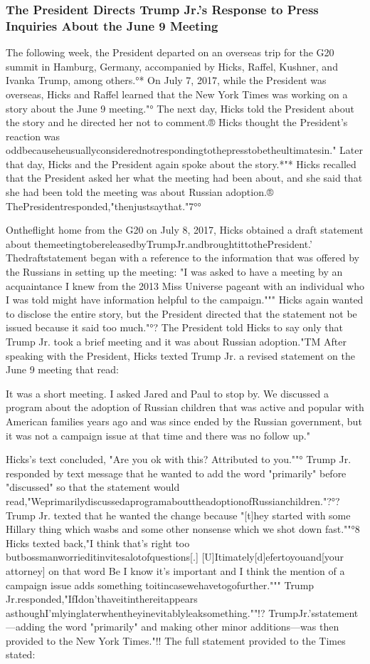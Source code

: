 \subsubsection{The President Directs Trump Jr.'s Response to Press Inquiries About the June 9 Meeting}

The following week, the President departed on an overseas trip for the G20 summit in Hamburg, Germany, accompanied by Hicks, Raffel, Kushner, and Ivanka Trump, among others.°*
On July 7, 2017, while the President was overseas, Hicks and Raffel learned that the New York Times was working on a story about the June 9 meeting."°
The next day, Hicks told the President about the story and he directed her not to comment.®
Hicks thought the President's reaction was oddbecauseheusuallyconsiderednotrespondingtothepresstobetheultimatesin."
Later that day, Hicks and the President again spoke about the story.*"*
Hicks recalled that the President asked her what the meeting had been about, and she said that she had been told the meeting was about Russian adoption.® ThePresidentresponded,"thenjustsaythat."7°°

Ontheflight home from the G20 on July 8, 2017, Hicks obtained a draft statement about themeetingtobereleasedbyTrumpJr.andbroughtittothePresident.'
Thedraftstatement began with a reference to the information that was offered by the Russians in setting up the meeting: "I was asked to have a meeting by an acquaintance I knew from the 2013 Miss Universe pageant with an individual who I was told might have information helpful to the campaign."""
Hicks again wanted to disclose the entire story, but the President directed that the statement not be
issued because it said too much."°? The President told Hicks to say only that Trump Jr. took a brief meeting and it was about Russian adoption."TM
After speaking with the President, Hicks texted Trump Jr. a revised statement on the June 9 meeting that read:

It was a short meeting.
I asked Jared and Paul to stop by.
We discussed a program about the adoption of Russian children that was active and popular with American families years ago and was since ended by the Russian government, but it was not a campaign issue at that time and there was no follow up."

Hicks's text concluded, "Are you ok with this? Attributed to you.""°
Trump Jr. responded by text message that he wanted to add the word "primarily" before "discussed" so that the statement would read,"WeprimarilydiscussedaprogramabouttheadoptionofRussianchildren."?°?
Trump Jr. texted that he wanted the change because "[t]hey started with some Hillary thing which wasbs and some other nonsense which we shot down fast.""°8
Hicks texted back,"I think that's right too butbossmanworrieditinvitesalotofquestions[.]
[U]Itimately[d]efertoyouand[your attorney] on that word Be I know it's important and I think the mention of a campaign issue adds something toitincasewehavetogofurther."""
Trump Jr.responded,"IfIdon'thaveitinthereitappears asthoughI'mlyinglaterwhentheyinevitablyleaksomething.""!?
TrumpJr.'sstatement—adding the word "primarily" and making other minor additions—was then provided to the New York Times."!!
The full statement provided to the Times stated:

